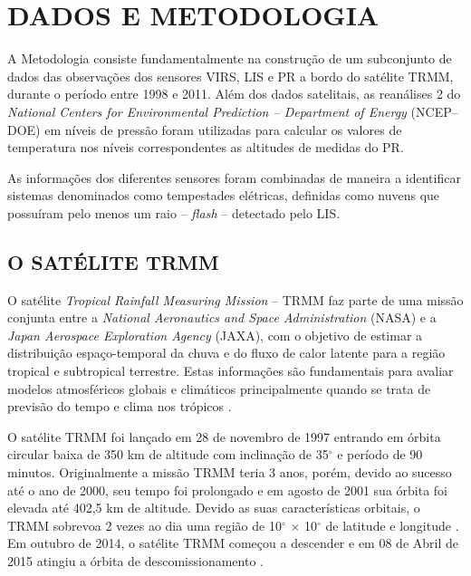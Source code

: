 \chapter{DADOS E METODOLOGIA}
\label{metodologia}

A Metodologia consiste fundamentalmente na construção de um subconjunto de dados das observações dos sensores VIRS, LIS e PR a bordo do satélite TRMM, durante o período entre 1998 e 2011. Além dos dados satelitais, as reanálises 2 do \textit{National Centers for Environmental Prediction -- Department of Energy
} (NCEP--DOE) em níveis de pressão foram utilizadas para calcular os valores de temperatura nos níveis correspondentes as altitudes de medidas do PR.

As informações dos diferentes sensores foram combinadas de maneira a identificar sistemas denominados como tempestades elétricas, definidas como nuvens que possuíram pelo menos um raio -- \textit{flash} -- detectado pelo LIS. 


\section{O SATÉLITE TRMM}
\label{metodologiaTRMM}

O satélite \textit{Tropical Rainfall Measuring Mission} -- TRMM  faz parte de uma missão conjunta entre a \textit{National Aeronautics and Space Administration} (NASA) e a \textit{Japan Aerospace Exploration Agency} (JAXA),  com o objetivo de estimar a distribuição espaço-temporal da chuva e do fluxo de calor latente para a região tropical e subtropical terrestre. Estas informações são fundamentais para avaliar modelos atmosféricos globais e climáticos principalmente quando se trata de previsão do tempo e clima nos trópicos \cite{kummerok1998,simpson1988}.

  

O satélite TRMM foi lançado em 28 de novembro de 1997 entrando em órbita circular baixa de 350 km de altitude com inclinação de 35$^{\circ}$ e período de 90 minutos. Originalmente a missão TRMM teria 3 anos, porém, devido ao sucesso até o ano de 2000, seu tempo foi prolongado e em agosto de 2001 sua órbita foi elevada até 402,5 km de altitude. Devido as suas características orbitais, o TRMM sobrevoa 2 vezes ao dia uma região de 10$^{\circ}$ $\times$ 10$^{\circ}$ de latitude e longitude \cite{simpson1988}. Em outubro de 2014, o satélite TRMM começou a descender e em 08 de Abril de 2015 atingiu a órbita de descomissionamento \cite{TRMMgoodbye,TRMMend}.

